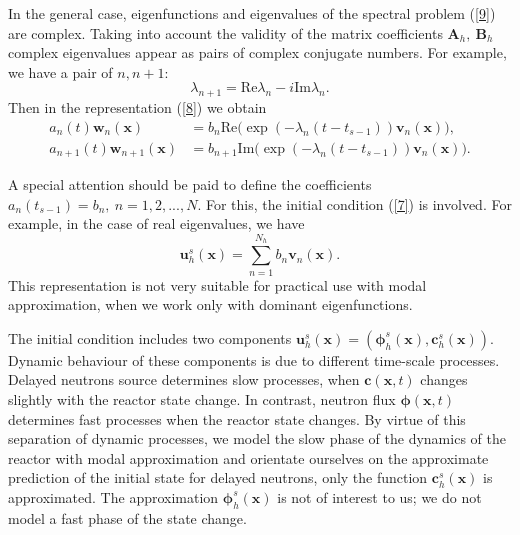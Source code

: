 \documentclass[a4paper]{jpconf}
\begin{document}
In the general case, eigenfunctions and eigenvalues of the spectral problem  (\ref{9}) are complex.
Taking into account the validity of the matrix coefficients  $\bm A_h, \ \bm B_h$ complex eigenvalues appear as pairs of complex conjugate numbers. For example, we have a pair of $n,n+1$: 
\[
 \lambda_{n+1} = \mathrm{Re} \lambda_n - i \mathrm{Im} \lambda_n . 
\] 
Then in the representation  (\ref{8}) we obtain
\[
\begin{split}
 a_n(t) \bm w_n(\bm x) & = b_n \mathrm{Re} \big ( \exp(-\lambda_n (t-t_{s-1})) \bm v_n(\bm x) \big ), \\
 a_{n+1}(t) \bm w_{n+1}(\bm x) & = b_{n+1} \mathrm{Im} \big ( \exp(-\lambda_n (t-t_{s-1})) \bm v_n(\bm x) \big ) .
\end{split}
\] 

A special attention should be paid to define the coefficients $a_n(t_{s-1}) = b_n, \ n = 1,2, ..., N$.
For this, the initial condition (\ref{7}) is involved. For example, in the case of real eigenvalues, we have
\[
 \bm u_h^s (\bm x) = \sum_{n=1}^{N_h} b_n \bm v_n(\bm x) .
\] 
This representation is not very suitable for practical use with modal approximation, when we work only with dominant eigenfunctions.  

The initial condition includes two components  $\bm u_h^s (\bm x) = (\bm \phi_h^s (\bm x), \bm c_h^s (\bm x))$.
Dynamic behaviour of these components is due to different time-scale processes. Delayed neutrons source determines slow processes, when  $\bm c(\bm x,t)$ changes slightly with the reactor state change. In contrast, neutron flux $\bm \phi(\bm x,t)$ determines fast processes when the reactor state changes. By virtue of this separation of dynamic processes, we model the slow phase of the dynamics of the reactor with modal approximation and orientate ourselves on the approximate prediction of the initial state for delayed neutrons, only the function  $\bm c_h^s (\bm x)$ is approximated. The approximation  $\bm \phi_h^s (\bm x)$ is not of interest to us; we do not model a fast phase of the state change.
\end{document}

